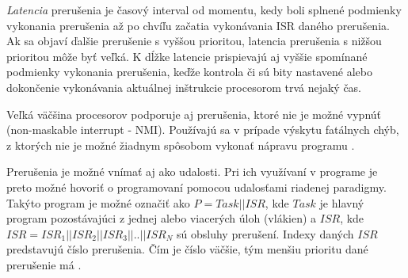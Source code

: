 \textit{Latencia} prerušenia je časový interval od momentu, kedy boli splnené podmienky vykonania prerušenia až po chvíľu začatia vykonávania ISR daného prerušenia.
Ak sa objaví ďalšie prerušenie s vyššou prioritou, latencia prerušenia s nižšou prioritou môže byť veľká.
K dĺžke latencie prispievajú aj vyššie spomínané podmienky vykonania prerušenia,
keďže kontrola či sú bity nastavené alebo dokončenie vykonávania aktuálnej inštrukcie procesorom trvá nejaký čas. \par
Veľká väčšina procesorov podporuje aj prerušenia, ktoré nie je možné vypnúť (non-maskable interrupt - \acrshort{NMI}).
Používajú sa v prípade výskytu fatálnych chýb, z ktorých nie je možné žiadnym spôsobom vykonať nápravu programu
\cite{regehrSafeStructuredUse2007}. \par
Prerušenia je možné vnímať aj ako udalosti. Pri ich využívaní v programe je preto možné hovoriť o programovaní pomocou udalosťami riadenej paradigmy.
Takýto program je možné označiť ako \begin{math}P=Task || ISR\end{math}, kde \begin{math}Task\end{math} je hlavný program pozostávajúci z
jednej alebo viacerých úloh (vlákien) a  \begin{math}ISR\end{math}, kde \begin{math}ISR=ISR_1||ISR_2||ISR_3||..||ISR_N\end{math} sú obsluhy prerušení.
Indexy daných \begin{math}ISR\end{math} predstavujú číslo prerušenia.
Čím je číslo väčšie, tým menšiu prioritu dané prerušenie má \cite{wangAutomaticDetectionValidation2017}. \par